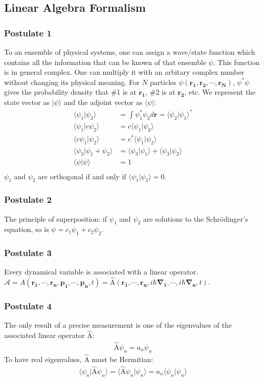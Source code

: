 \documentclass[a4paper]{article}
\newcommand{\ve}[1]{
  \ensuremath{\bm{#1}}}	               %
\newcommand{\cc}[1]{
  \ensuremath{#1^{\ast}}}              %
\newcommand{\operator}[1]{
  \ensuremath{\hat{\text{#1}}}}        %
\newcommand{\bra}[1]{
  \ensuremath{\langle #1 |}}           %
\newcommand{\ket}[1]{
  \ensuremath{| #1 \rangle }}          %
\newcommand{\braket}[2]{
  \ensuremath{\langle #1|#2 \rangle }} %
\begin{document}
\begin{multicols*}{2}
\subsection{Linear Algebra Formalism}
\subsubsection{Postulate 1}
To an ensemble of physical systems, one can assign a wave/state function which contains all the information that can be known of that ensemble $\psi$. This function is in general complex. One can multiply it with an arbitary complex number without changing its physical meaning. For $N$ particles $\psi(\ve{r_1}, \ve{r_2}, \cdots, \ve{r_N})$, $\cc{\psi} \psi$ gives the probability density that \#1 is at $\ve{r_1}$, \#2 is at $\ve{r_2}$, etc. We represent the state vector as $\ket{\psi}$ and the adjoint vector as $\bra{\psi}$:
\begin{align*}
  \braket{\psi_1}{\psi_2} &= \int \cc{\psi_1} \psi_2 d\ve{r} = \cc{\braket{\psi_2}{\psi_1}}\\
  \braket{\psi_1}{c\psi_2} &= c \braket{\psi_1}{\psi_2} \\
  \braket{c\psi_1}{\psi_2} &= \cc{c} \braket{\psi_1}{\psi_2} \\
  \braket{\psi_3}{\psi_1 + \psi_2} &= \braket{\psi_3}{\psi_1} + \braket{\psi_3}{\psi_2} \\
  \braket{\psi}{\psi} &= 1\\
\end{align*}
$\psi_1$ and $\psi_2$ are orthogonal if and only if $\braket{\psi_1}{\psi_2} = 0$.

\subsubsection{Postulate 2}
The principle of superposition: if $\psi_1$ and $\psi_2$ are solutions to the Schr\"{o}dinger's equation, so is $\psi = c_1 \psi_1 + c_2 \psi_2$.

\subsubsection{Postulate 3}
Every dynamical variable is associated with a linear operator. $\mathcal{A} = A(\ve{r_1}, \cdots, \ve{r_n}, \ve{p_1}, \cdots, \ve{p_n}, t) = \operator{A}(\ve{r_1}, \cdots, \ve{r_n}, i\hbar \ve{\nabla_1}, \cdots, i\hbar \ve{\nabla_n}, t)$.

\subsubsection{Postulate 4}
The only result of a precise measurement is one of the eigenvalues of the associated linear operator $\operator{A}$:
\begin{align*}
  \operator{A} \psi_n = a_n \psi_n
\end{align*}
To have real eigenvalues, $\operator{A}$ must be Hermitian:
\begin{align*}
  \braket{\psi_n}{\operator{A} \psi_n} = \braket{\operator{A} \psi_n}{\psi_n} = a_n\braket{\psi_n}{\psi_n}
\end{align*}


\end{multicols*}
\end{document}
